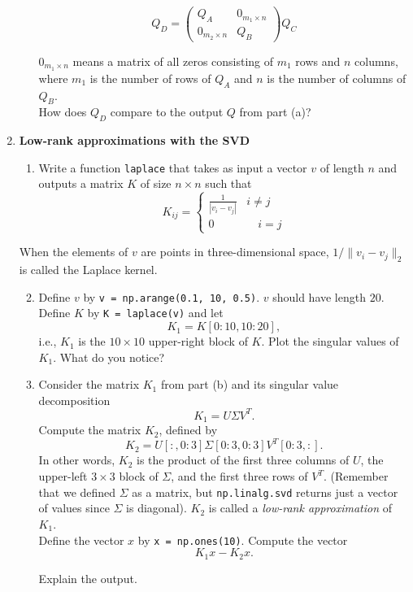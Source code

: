\documentclass{article}
\newcounter{points}
\newcommand\printpoints{Total number of points: \thepoints}
\begin{document}
\begin{enumerate}
\begin{enumerate}
\[
Q_D = \begin{pmatrix} Q_A & 0_{m_1 \times n} \\ 0_{m_2 \times n} & Q_B \end{pmatrix}Q_C
\]

$0_{m_1 \times n}$ means a matrix of all zeros consisting of $m_1$ rows and $n$ columns, where $m_1$ is the number of rows of $Q_A$ and $n$ is the number of columns of $Q_B$. \\

How does $Q_D$ compare to the output $Q$ from part (a)?

\end{enumerate}

\newpage
\item \textbf{Low-rank approximations with the SVD} \\

\begin{enumerate}
\item Write a function \texttt{laplace} that takes as input a vector $v$ of length $n$ and outputs a matrix $K$ of size $n \times n$ such that
\[
K_{ij} = \left\{
     \begin{array}{lr}
       \frac{1}{|v_i - v_j|}  & i \neq j \\
       0 & \quad i = j
     \end{array}
   \right.
\]
\end{enumerate}

When the elements of $v$ are points in three-dimensional space, $1 / \| v_i - v_j \|_2$ is called the Laplace kernel.

\begin{enumerate}
\setcounter{enumii}{1}
\item Define $v$ by \texttt{v = np.arange(0.1, 10, 0.5)}.  $v$ should have length $20$.  Define $K$ by \texttt{K = laplace(v)} and let
\[
K_1 = K[0:10, 10:20],
\]
i.e., $K_1$ is the $10 \times 10$ upper-right block of $K$.  Plot the singular values of $K_1$.  What do you notice?
\end{enumerate}


\begin{enumerate}
\setcounter{enumii}{2}
\item Consider the matrix $K_1$ from part (b) and its singular value decomposition
\[
K_1 = U\Sigma V^T.
\]
Compute the matrix $K_2$, defined by
\[
K_2 = U[:, 0:3]\Sigma[0:3, 0:3] V^T[0:3, :].
\]
In other words, $K_2$ is the product of the first three columns of $U$, the upper-left $3 \times 3$ block of $\Sigma$, and the first three rows of $V^T$.
(Remember that we defined $\Sigma$ as a matrix, but \texttt{np.linalg.svd} returns just a vector of values since $\Sigma$ is diagonal).
$K_2$ is called a \emph{low-rank approximation} of $K_1$. \\

Define the vector $x$ by \texttt{x = np.ones(10)}.  Compute the vector
\[
K_1x - K_2x.
\]

Explain the output.

\end{enumerate}




\end{enumerate}
\end{document}
